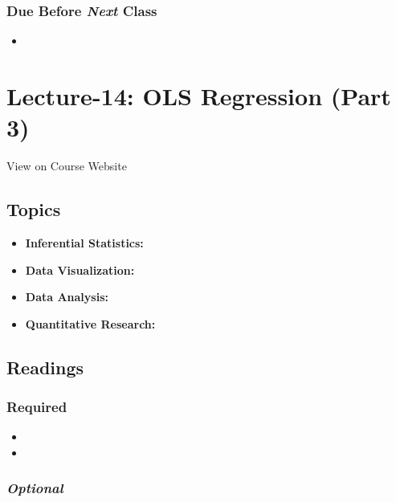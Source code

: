 \documentclass[]{book}
\providecommand{\tightlist}{%
  \setlength{\itemsep}{0pt}\setlength{\parskip}{0pt}}
\theoremstyle{definition}
\theoremstyle{definition}
\theoremstyle{definition}
\theoremstyle{remark}
\begin{document}
\subsubsection*{\texorpdfstring{Due Before \emph{Next}
Class}{Due Before Next Class}}\label{due-before-next-class-13}

\begin{itemize}
\item
\end{itemize}

\section{Lecture-14: OLS Regression (Part
3)}\label{lecture-14-ols-regression-part-3}

View on Course Website

\subsection*{Topics}\label{topics-14}

\begin{itemize}
\tightlist
\item
  \textbf{Inferential Statistics:}
\item
  \textbf{Data Visualization:}
\item
  \textbf{Data Analysis:}
\item
  \textbf{Quantitative Research:}
\end{itemize}

\subsection*{Readings}\label{readings-15}

\subsubsection*{Required}\label{required-14}

\begin{itemize}
\item
\item
\end{itemize}

\subsubsection*{\texorpdfstring{\emph{Optional}}{Optional}}\label{optional-14}
\end{document}
